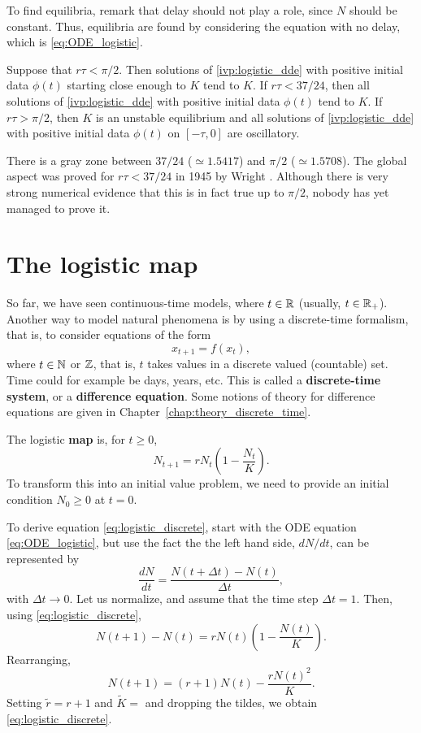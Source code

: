 \vskip0.5cm
To find equilibria, remark that delay should not play a role, since $N$ should be constant. Thus, equilibria are found by considering the equation with no delay, which is \eqref{eq:ODE_logistic}.
\begin{theorem}
Suppose that $r\tau<\pi/2$. Then solutions of \eqref{ivp:logistic_dde} with positive initial data $\phi(t)$ starting close enough to $K$ tend to $K$. If $r\tau<37/24$, then all solutions of  \eqref{ivp:logistic_dde} with positive initial data $\phi(t)$ tend to $K$. If $r\tau>\pi/2$, then $K$ is an unstable equilibrium and all solutions of \eqref{ivp:logistic_dde} with positive initial data $\phi(t)$ on $[-\tau,0]$ are oscillatory.
\end{theorem}
There is a gray zone between $37/24$ ($\simeq 1.5417$) and $\pi/2$ ($\simeq 1.5708$). The global aspect was proved for $r\tau<37/24$ in 1945 by Wright \cite{Wright1955}. Although there is very strong numerical evidence that this is in fact true up to $\pi/2$, nobody has yet managed to prove it.

\section{The logistic map}
\label{sec:DE_logistic}

So far, we have seen continuous-time models, where $t\in\mathbb{R}$ (usually, $t\in\mathbb{R}_+$). Another way to model natural phenomena is by using a discrete-time formalism, that is, to consider equations of the form
\[
x_{t+1}=f(x_t),
\]
where $t\in\mathbb{N}$ or $\mathbb{Z}$, that is, $t$ takes values in a discrete valued (countable) set.
Time could for example be days, years, etc. This is called a \textbf{discrete-time system}, or a \textbf{difference equation}.
Some notions of theory for difference equations are given in Chapter~\ref{chap:theory_discrete_time}.



The logistic \textbf{map} is, for $t\geq 0$,
\begin{equation}\label{eq:logistic_discrete}
N_{t+1}=rN_t\left(1-\frac{N_t}K\right).
\end{equation}
To transform this into an initial value problem, we need to provide an initial condition $N_0\geq 0$ at $t=0$.

To derive equation \eqref{eq:logistic_discrete}, start with the ODE equation \eqref{eq:ODE_logistic}, but use the fact the the left hand side, $dN/dt$, can be represented by
\[
\frac{dN}{dt}=\frac{N(t+\Delta t)-N(t)}{\Delta t},
\]
with $\Delta t\to 0$. Let us normalize, and assume that the time step $\Delta t=1$. Then, using \eqref{eq:logistic_discrete},
\[
N(t+1)-N(t)=rN(t)\left(1-\frac{N(t)}{K}\right).
\]
Rearranging, 
\[
N(t+1)=(r+1)N(t)-\frac{rN(t)^2}{K}.
\]
Setting $\tilde r=r+1$ and $\tilde K=$ and dropping the tildes, we obtain \eqref{eq:logistic_discrete}.

